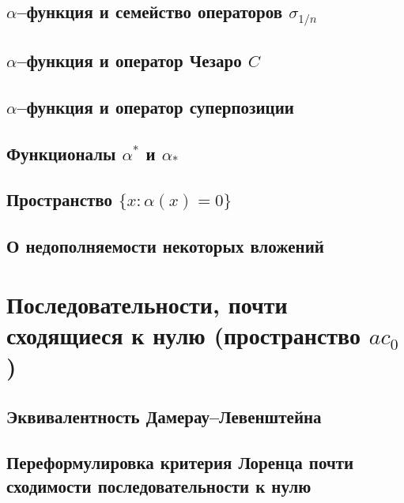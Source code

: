 \documentclass[12pt,a4paper,openbib]{report}
\theoremstyle{definition}
\begin{document}
	\section{$\alpha$--функция и семейство операторов $\sigma_{1/n}$}
	

	\section{$\alpha$--функция и оператор Чезаро $C$}
	

	\section{$\alpha$--функция и оператор суперпозиции}
	

	\section{Функционалы $\alpha^*$ и $\alpha_*$}
	

	\section{Пространство $\{x: \alpha(x) = 0\}$}
	

	\section{О недополняемости некоторых вложений}
	


\chapter{Последовательности, почти сходящиеся к нулю (пространство $ac_0$)}

	

	\section{Эквивалентность Дамерау--Левенштейна}
	

	\section{Переформулировка критерия Лоренца почти сходимости последовательности к нулю}
	
\end{document}
